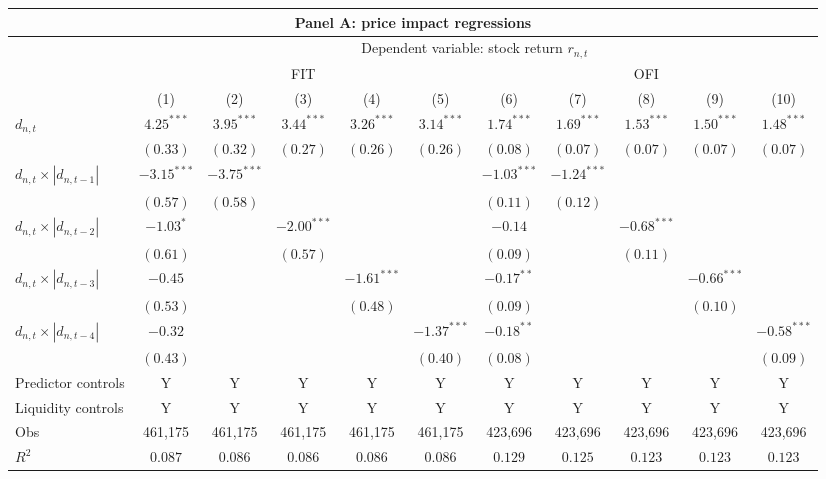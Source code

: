 \begin{tabular}{lcccccccccc}
  \toprule \multicolumn{11}{c}{Panel A: price impact regressions} \\
 \hline
                                    & \multicolumn{10}{c}{Dependent variable: stock return $r_{n,t}$} \\
 \cmidrule(l){2-11}
                                    & \multicolumn{5}{c}{FIT} & \multicolumn{5}{c}{OFI} \\
 \cmidrule(l){2-6} \cmidrule(l){7-11} 
  & (1) & (2) & (3) & (4) & (5) & (6) & (7) & (8) & (9) & (10) \\ 
  $d_{n,t}$ & $4.25^{***}$ & $3.95^{***}$ & $3.44^{***}$ & $3.26^{***}$ & $3.14^{***}$ & $1.74^{***}$ & $1.69^{***}$ & $1.53^{***}$ & $1.50^{***}$ & $1.48^{***}$ \\ 
   & $(0.33)$ & $(0.32)$ & $(0.27)$ & $(0.26)$ & $(0.26)$ & $(0.08)$ & $(0.07)$ & $(0.07)$ & $(0.07)$ & $(0.07)$ \\ 
  $d_{n,t} \times |d_{n,t-1}|$ & $-3.15^{***}$ & $-3.75^{***}$ &  &  &  & $-1.03^{***}$ & $-1.24^{***}$ &  &  &  \\ 
   & $(0.57)$ & $(0.58)$ &  &  &  & $(0.11)$ & $(0.12)$ &  &  &  \\ 
  $d_{n,t} \times |d_{n,t-2}|$ & $-1.03^{*}$ &  & $-2.00^{***}$ &  &  & $-0.14$ &  & $-0.68^{***}$ &  &  \\ 
   & $(0.61)$ &  & $(0.57)$ &  &  & $(0.09)$ &  & $(0.11)$ &  &  \\ 
  $d_{n,t} \times |d_{n,t-3}|$ & $-0.45$ &  &  & $-1.61^{***}$ &  & $-0.17^{**}$ &  &  & $-0.66^{***}$ &  \\ 
   & $(0.53)$ &  &  & $(0.48)$ &  & $(0.09)$ &  &  & $(0.10)$ &  \\ 
  $d_{n,t} \times |d_{n,t-4}|$ & $-0.32$ &  &  &  & $-1.37^{***}$ & $-0.18^{**}$ &  &  &  & $-0.58^{***}$ \\ 
   \vspace{5pt} & $(0.43)$ &  &  &  & $(0.40)$ & $(0.08)$ &  &  &  & $(0.09)$ \\ 
  Predictor controls & Y & Y & Y & Y & Y & Y & Y & Y & Y & Y \\ 
   \vspace{5pt}Liquidity controls & Y & Y & Y & Y & Y & Y & Y & Y & Y & Y \\ 
  Obs & 461,175 & 461,175 & 461,175 & 461,175 & 461,175 & 423,696 & 423,696 & 423,696 & 423,696 & 423,696 \\ 
  $R^2$ & $0.087$ & $0.086$ & $0.086$ & $0.086$ & $0.086$ & $0.129$ & $0.125$ & $0.123$ & $0.123$ & $0.123$ \\ 

\end{tabular}
